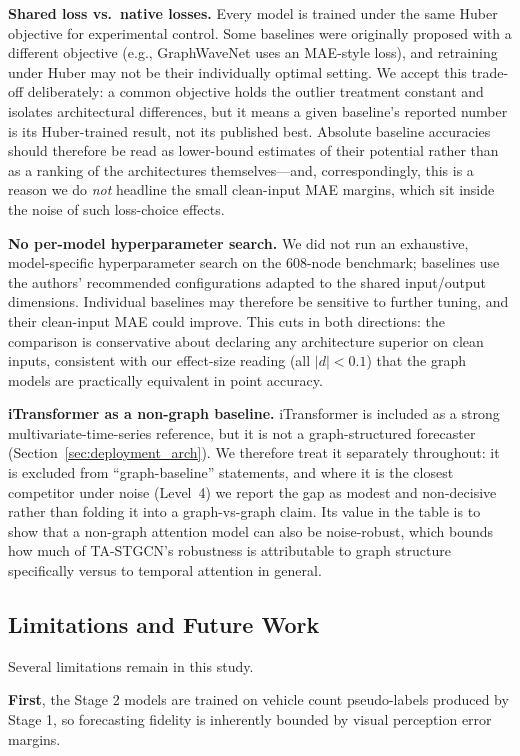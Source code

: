 \documentclass[preprint,12pt]{elsarticle}
\begin{document}
\textbf{Shared loss vs.\ native losses.} Every model is trained under the same Huber objective for experimental control. Some baselines were originally proposed with a different objective (e.g., GraphWaveNet uses an MAE-style loss), and retraining under Huber may not be their individually optimal setting. We accept this trade-off deliberately: a common objective holds the outlier treatment constant and isolates architectural differences, but it means a given baseline's reported number is its Huber-trained result, not its published best. Absolute baseline accuracies should therefore be read as lower-bound estimates of their potential rather than as a ranking of the architectures themselves---and, correspondingly, this is a reason we do \emph{not} headline the small clean-input MAE margins, which sit inside the noise of such loss-choice effects.

\textbf{No per-model hyperparameter search.} We did not run an exhaustive, model-specific hyperparameter search on the 608-node benchmark; baselines use the authors' recommended configurations adapted to the shared input/output dimensions. Individual baselines may therefore be sensitive to further tuning, and their clean-input MAE could improve. This cuts in both directions: the comparison is conservative about declaring any architecture superior on clean inputs, consistent with our effect-size reading (all $|d|<0.1$) that the graph models are practically equivalent in point accuracy.

\textbf{iTransformer as a non-graph baseline.} iTransformer is included as a strong multivariate-time-series reference, but it is not a graph-structured forecaster (Section~\ref{sec:deployment_arch}). We therefore treat it separately throughout: it is excluded from ``graph-baseline'' statements, and where it is the closest competitor under noise (Level~4) we report the gap as modest and non-decisive rather than folding it into a graph-vs-graph claim. Its value in the table is to show that a non-graph attention model can also be noise-robust, which bounds how much of TA-STGCN's robustness is attributable to graph structure specifically versus to temporal attention in general.

\subsection{Limitations and Future Work}
\label{sec:limitations}
Several limitations remain in this study.

\textbf{First}, the Stage 2 models are trained on vehicle count pseudo-labels produced by Stage 1, so forecasting fidelity is inherently bounded by visual perception error margins.
\end{document}
